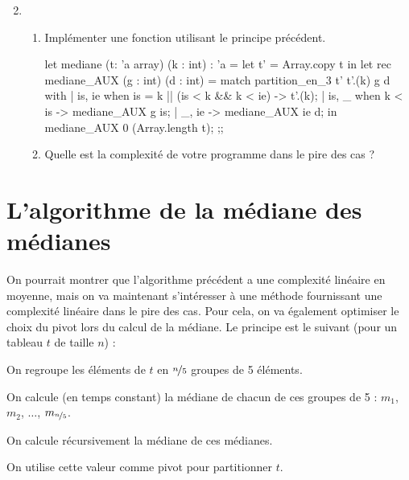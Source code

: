 \documentclass[a4paper,french,bookmarks]{article}
\begin{document}
\begin{enumerate}\setcounter{enumi}{1} 
    \item \begin{enumerate}
        \item Implémenter une fonction  utilisant le principe précédent.
        
        \begin{ocaml}
let mediane (t: 'a array) (k : int) : 'a =
    let t' = Array.copy t in let rec mediane_AUX (g : int) (d : int) =
        match partition_en_3 t' t'.(k) g d with
        | is, ie when is = k || (is < k && k < ie) -> t'.(k);
        | is, _ when k < is -> mediane_AUX g is;
        | _, ie -> mediane_AUX ie d;
    in mediane_AUX 0 (Array.length t);
;;
        \end{ocaml}
        
        \newpage
        
        \item\label{question2:2b} Quelle est la complexité de votre programme dans le pire des cas ?
        
    \end{enumerate}
\end{enumerate}

\section{L’algorithme de la médiane des médianes}

On pourrait montrer que l’algorithme précédent a une complexité linéaire en moyenne, mais on va maintenant s’intéresser à une méthode fournissant une complexité linéaire dans le pire des cas. Pour cela, on va également optimiser le choix du pivot lors du calcul de la médiane. Le principe est le suivant (pour un tableau $t$ de taille $n$) : 

\begin{enumerate}
    \ithand On regroupe les éléments de $t$ en $\nicefrac{n}{5}$ groupes de 5 éléments.
    
    \ithand On calcule (en temps constant) la médiane de chacun de ces groupes de 5 : $m_1$, $m_2$, $\dots$, $m_{\nicefrac{n}{5}}$.
    
    \ithand On calcule récursivement la médiane de ces médianes.
    
    \ithand On utilise cette valeur comme pivot pour partitionner $t$.
\end{enumerate}
\end{document}
